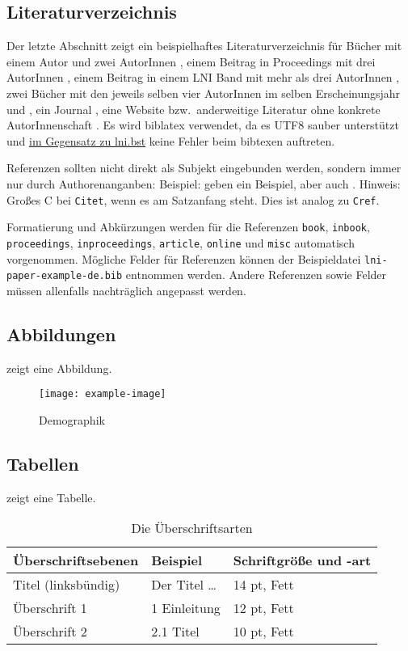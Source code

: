 \documentclass[biblatex]{lni}
\begin{document}
  \subsection{Literaturverzeichnis}
  Der letzte Abschnitt zeigt ein beispielhaftes Literaturverzeichnis für Bücher mit einem Autor \cite{Ez10} und zwei AutorInnen \cite{AB00}, einem Beitrag in Proceedings mit drei AutorInnen \cite{ABC01}, einem Beitrag in einem LNI Band mit mehr als drei AutorInnen \cite{Az09}, zwei Bücher mit den jeweils selben vier AutorInnen im selben Erscheinungsjahr \cite{Wa14} und \cite{Wa14b}, ein Journal \cite{Gl06}, eine Website \cite{GI19} bzw.\ anderweitige Literatur ohne konkrete AutorInnenschaft \cite{XX14}.
  Es wird biblatex verwendet, da es UTF8 sauber unterstützt und \href{https://github.com/gi-ev/LNI/issues/5}{im Gegensatz zu lni.bst} keine Fehler beim bibtexen auftreten.

  Referenzen sollten nicht direkt als Subjekt eingebunden werden, sondern immer nur durch Authorenanganben:
  Beispiel:  geben ein Beispiel, aber auch \citet{Az09}.
  Hinweis: Großes C bei \texttt{Citet}, wenn es am Satzanfang steht. Dies ist analog zu \texttt{Cref}.

  Formatierung und Abkürzungen werden für die Referenzen \texttt{book}, \texttt{inbook}, \texttt{proceedings}, \texttt{inproceedings}, \texttt{article}, \texttt{online} und \texttt{misc} automatisch vorgenommen.
  Mögliche Felder für Referenzen können der Beispieldatei \texttt{lni-paper-example-de.bib} entnommen werden.
  Andere Referenzen sowie Felder müssen allenfalls nachträglich angepasst werden.

  \subsection{Abbildungen}
   zeigt eine Abbildung.

  \begin{figure}
    \centering
    \texttt{[image: example-image]}
    \caption{Demographik}
    \label{fig:demo}
  \end{figure}

  \subsection{Tabellen}
   zeigt eine Tabelle.

  \begin{table}
    \centering
    \begin{tabular}{lll}
      \toprule
      Überschriftsebenen & Beispiel & Schriftgröße und -art \\
      \midrule
      Titel (linksbündig) & Der Titel \ldots & 14 pt, Fett\\
      Überschrift 1 & 1 Einleitung & 12 pt, Fett\\
      Überschrift 2 & 2.1 Titel & 10 pt, Fett\\
      \bottomrule
    \end{tabular}
    \caption{Die Überschriftsarten}
    \label{tab:demo}
  \end{table}
\end{document}
